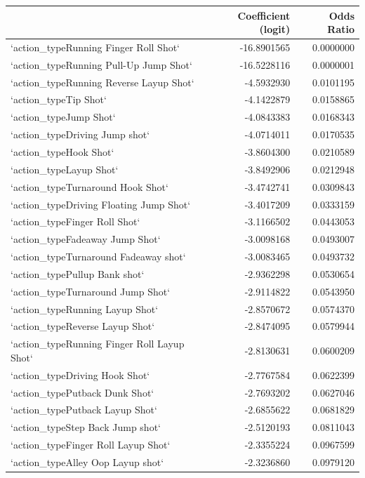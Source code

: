 \documentclass[american,]{article}
\begin{document}
\begin{tabular}{lrr}
\toprule
  & Coefficient (logit) & Odds Ratio\\
\midrule
`action\_typeRunning Finger Roll Shot` & -16.8901565 & 0.0000000\\
`action\_typeRunning Pull-Up Jump Shot` & -16.5228116 & 0.0000001\\
`action\_typeRunning Reverse Layup Shot` & -4.5932930 & 0.0101195\\
`action\_typeTip Shot` & -4.1422879 & 0.0158865\\
`action\_typeJump Shot` & -4.0843383 & 0.0168343\\
\addlinespace
`action\_typeDriving Jump shot` & -4.0714011 & 0.0170535\\
`action\_typeHook Shot` & -3.8604300 & 0.0210589\\
`action\_typeLayup Shot` & -3.8492906 & 0.0212948\\
`action\_typeTurnaround Hook Shot` & -3.4742741 & 0.0309843\\
`action\_typeDriving Floating Jump Shot` & -3.4017209 & 0.0333159\\
\addlinespace
`action\_typeFinger Roll Shot` & -3.1166502 & 0.0443053\\
`action\_typeFadeaway Jump Shot` & -3.0098168 & 0.0493007\\
`action\_typeTurnaround Fadeaway shot` & -3.0083465 & 0.0493732\\
`action\_typePullup Bank shot` & -2.9362298 & 0.0530654\\
`action\_typeTurnaround Jump Shot` & -2.9114822 & 0.0543950\\
\addlinespace
`action\_typeRunning Layup Shot` & -2.8570672 & 0.0574370\\
`action\_typeReverse Layup Shot` & -2.8474095 & 0.0579944\\
`action\_typeRunning Finger Roll Layup Shot` & -2.8130631 & 0.0600209\\
`action\_typeDriving Hook Shot` & -2.7767584 & 0.0622399\\
`action\_typePutback Dunk Shot` & -2.7693202 & 0.0627046\\
\addlinespace
`action\_typePutback Layup Shot` & -2.6855622 & 0.0681829\\
`action\_typeStep Back Jump shot` & -2.5120193 & 0.0811043\\
`action\_typeFinger Roll Layup Shot` & -2.3355224 & 0.0967599\\
`action\_typeAlley Oop Layup shot` & -2.3236860 & 0.0979120\\

\end{tabular}
\end{document}
